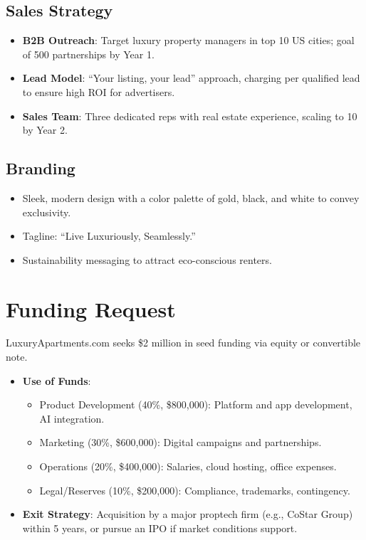 \documentclass[12pt]{article}
\begin{document}
\subsection{Sales Strategy}
\begin{itemize}
    \item \textbf{B2B Outreach}: Target luxury property managers in top 10 US cities; goal of 500 partnerships by Year 1.
    \item \textbf{Lead Model}: ``Your listing, your lead'' approach, charging per qualified lead to ensure high ROI for advertisers.
    \item \textbf{Sales Team}: Three dedicated reps with real estate experience, scaling to 10 by Year 2.
\end{itemize}

\subsection{Branding}
\begin{itemize}
    \item Sleek, modern design with a color palette of gold, black, and white to convey exclusivity.
    \item Tagline: ``Live Luxuriously, Seamlessly.''
    \item Sustainability messaging to attract eco-conscious renters.
\end{itemize}

\section{Funding Request}
LuxuryApartments.com seeks \$2 million in seed funding via equity or convertible note.
\begin{itemize}
    \item \textbf{Use of Funds}:
    \begin{itemize}
        \item Product Development (40\%, \$800,000): Platform and app development, AI integration.
        \item Marketing (30\%, \$600,000): Digital campaigns and partnerships.
        \item Operations (20\%, \$400,000): Salaries, cloud hosting, office expenses.
        \item Legal/Reserves (10\%, \$200,000): Compliance, trademarks, contingency.
    \end{itemize}
    \item \textbf{Exit Strategy}: Acquisition by a major proptech firm (e.g., CoStar Group) within 5 years, or pursue an IPO if market conditions support.
\end{itemize}
\end{document}
